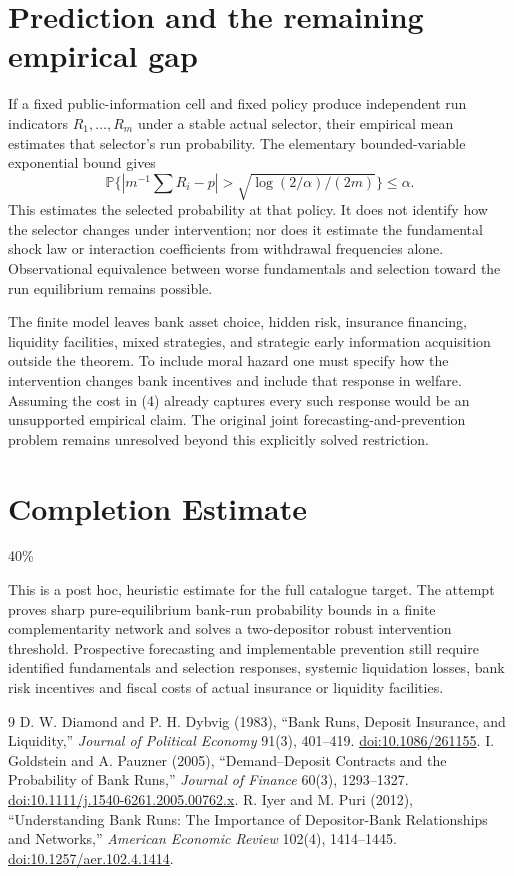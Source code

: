 \documentclass[11pt,a4paper]{article}
\theoremstyle{remark}
\newcommand{\Prob}{\mathbb P}
\begin{document}
\section{Prediction and the remaining empirical gap}
If a fixed public-information cell and fixed policy produce independent run indicators $R_1,\ldots,R_m$ under a stable actual selector, their empirical mean estimates that selector's run probability. The elementary bounded-variable exponential bound gives
\[
 \Prob\{|m^{-1}\sum R_i-p|>\sqrt{\log(2/\alpha)/(2m)}\}\le\alpha.
\]
This estimates the selected probability at that policy. It does not identify how the selector changes under intervention; nor does it estimate the fundamental shock law or interaction coefficients from withdrawal frequencies alone. Observational equivalence between worse fundamentals and selection toward the run equilibrium remains possible.

The finite model leaves bank asset choice, hidden risk, insurance financing, liquidity facilities, mixed strategies, and strategic early information acquisition outside the theorem. To include moral hazard one must specify how the intervention changes bank incentives and include that response in welfare. Assuming the cost in (4) already captures every such response would be an unsupported empirical claim. The original joint forecasting-and-prevention problem remains unresolved beyond this explicitly solved restriction.

\section{Completion Estimate}
40\%

This is a post hoc, heuristic estimate for the full catalogue target.
The attempt proves sharp pure-equilibrium bank-run probability bounds in a finite complementarity network and solves a two-depositor robust intervention threshold. Prospective forecasting and implementable prevention still require identified fundamentals and selection responses, systemic liquidation losses, bank risk incentives and fiscal costs of actual insurance or liquidity facilities.

\begin{thebibliography}{9}
 D. W. Diamond and P. H. Dybvig (1983), ``Bank Runs, Deposit Insurance, and Liquidity,'' \emph{Journal of Political Economy} 91(3), 401--419. \href{https://doi.org/10.1086/261155}{doi:10.1086/261155}.
 I. Goldstein and A. Pauzner (2005), ``Demand--Deposit Contracts and the Probability of Bank Runs,'' \emph{Journal of Finance} 60(3), 1293--1327. \href{https://doi.org/10.1111/j.1540-6261.2005.00762.x}{doi:10.1111/j.1540-6261.2005.00762.x}.
 R. Iyer and M. Puri (2012), ``Understanding Bank Runs: The Importance of Depositor-Bank Relationships and Networks,'' \emph{American Economic Review} 102(4), 1414--1445. \href{https://doi.org/10.1257/aer.102.4.1414}{doi:10.1257/aer.102.4.1414}.
\end{thebibliography}
\end{document}
